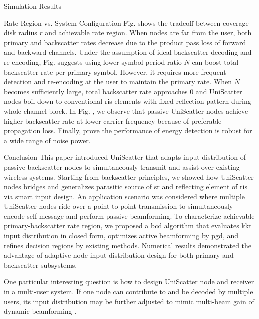 \documentclass[journal]{IEEEtran}
\begin{document}
\begin{section}{Simulation Results}
\begin{subsection}{Rate Region vs. System Configuration}
		Fig.  shows the tradeoff between coverage disk radius $r$ and achievable rate region.
		When nodes are far from the user, both primary and backscatter rates decrease due to the product pass loss of forward and backward channels.
		Under the assumption of ideal backscatter decoding and re-encoding, Fig.  suggests using lower symbol period ratio $N$ can boost total backscatter rate per primary symbol.
		However, it requires more frequent detection and re-encoding at the user to maintain the primary rate.
		When $N$ becomes sufficiently large, total backscatter rate approaches \num{0} and UniScatter nodes boil down to conventional \gls{ris} elements with fixed reflection pattern during whole channel block.
		In Fig. , we observe that passive UniScatter nodes achieve higher backscatter rate at lower carrier frequency because of preferable propagation loss.
		Finally,  prove the performance of energy detection is robust for a wide range of noise power.
	\end{subsection}
	\label{se:simulation_results}
\end{section}

\begin{section}{Conclusion}
	This paper introduced UniScatter that adapts input distribution of passive backscatter nodes to simultaneously transmit and assist over existing wireless systems.
	Starting from backscatter principles, we showed how UniScatter nodes bridges and generalizes parasitic source of \gls{sr} and reflecting element of \gls{ris} via smart input design.
	An application scenario was considered where multiple UniScatter nodes ride over a point-to-point transmission to simultaneously encode self message and perform passive beamforming.
	To characterize achievable primary-backscatter rate region, we proposed a \gls{bcd} algorithm that evaluates \gls{kkt} input distribution in closed form, optimizes active beamforming by \gls{pgd}, and refines decision regions by existing methods.
	Numerical results demonstrated the advantage of adaptive node input distribution design for both primary and backscatter subsystems.

	One particular interesting question is how to design UniScatter node and receiver in a multi-user system.
	If one node can contribute to and be decoded by multiple users, its input distribution may be further adjusted to mimic multi-beam gain of dynamic beamforming \cite{Qiu2022}.
\end{section}
\end{document}

